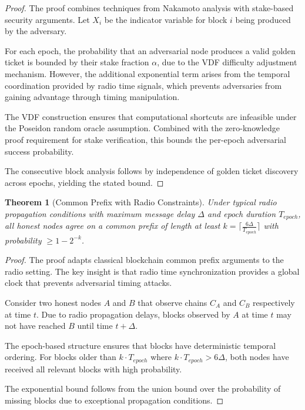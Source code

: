 \documentclass[11pt,a4paper]{article}
\newtheorem{theorem}{Theorem}[section]
\begin{document}
\begin{proof}
The proof combines techniques from Nakamoto analysis with stake-based security arguments. Let $X_i$ be the indicator variable for block $i$ being produced by the adversary.

For each epoch, the probability that an adversarial node produces a valid golden ticket is bounded by their stake fraction $\alpha$, due to the VDF difficulty adjustment mechanism. However, the additional exponential term arises from the temporal coordination provided by radio time signals, which prevents adversaries from gaining advantage through timing manipulation.

The VDF construction ensures that computational shortcuts are infeasible under the Poseidon random oracle assumption. Combined with the zero-knowledge proof requirement for stake verification, this bounds the per-epoch adversarial success probability.

The consecutive block analysis follows by independence of golden ticket discovery across epochs, yielding the stated bound.
\end{proof}

\begin{theorem}[Common Prefix with Radio Constraints]
Under typical radio propagation conditions with maximum message delay $\Delta$ and epoch duration $T_{epoch}$, all honest nodes agree on a common prefix of length at least $k = \lceil \frac{6\Delta}{T_{epoch}} \rceil$ with probability $\geq 1 - 2^{-k}$.
\end{theorem}

\begin{proof}
The proof adapts classical blockchain common prefix arguments to the radio setting. The key insight is that radio time synchronization provides a global clock that prevents adversarial timing attacks.

Consider two honest nodes $A$ and $B$ that observe chains $C_A$ and $C_B$ respectively at time $t$. Due to radio propagation delays, blocks observed by $A$ at time $t$ may not have reached $B$ until time $t + \Delta$.

The epoch-based structure ensures that blocks have deterministic temporal ordering. For blocks older than $k \cdot T_{epoch}$ where $k \cdot T_{epoch} > 6\Delta$, both nodes have received all relevant blocks with high probability.

The exponential bound follows from the union bound over the probability of missing blocks due to exceptional propagation conditions.
\end{proof}
\end{document}
